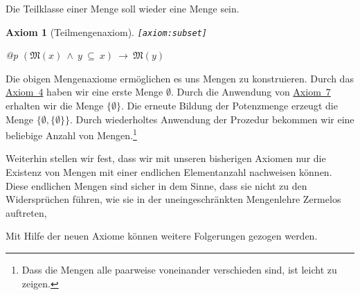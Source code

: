 \documentclass[a4paper,german,10pt,twoside]{book}
\newtheorem{ax}{Axiom}
\theoremstyle{definition}
\theoremstyle{remark}
\begin{document}
\par
Die Teilklasse einer Menge soll wieder eine Menge sein.

\begin{ax}[Teilmengenaxiom]
\label{axiom:subset} \hypertarget{axiom:subset}{}
{\tt \tiny [\verb]axiom:subset]]}
\mbox{}
\begin{longtable}{{@{\extracolsep{\fill}}p{\linewidth}}}
\centering $(\mathfrak{M}(x)\ \land\ y \ \subseteq \ x)\ \rightarrow\ \mathfrak{M}(y)$
\end{longtable}

\end{ax}


Die obigen Mengenaxiome erm{\"o}glichen es uns Mengen zu konstruieren.
Durch das \hyperlink{axiom:emptySet}{Axiom~4} haben wir eine erste Menge $\emptyset$. 
Durch die Anwendung von \hyperlink{axiom:powerSet}{Axiom~7} erhalten wir die Menge
$\{ \emptyset \}$. Die erneute Bildung der Potenzmenge erzeugt die Menge
$\{ \emptyset, \{ \emptyset \} \}$. Durch wiederholtes Anwendung der Prozedur
bekommen wir eine beliebige Anzahl von Mengen.\footnote{Dass die Mengen alle
paarweise voneinander verschieden sind, ist leicht zu zeigen.}

\par
Weiterhin stellen wir fest, dass wir mit unseren bisherigen Axiomen nur die 
Existenz von Mengen mit einer endlichen Elementanzahl nachweisen k{\"o}nnen.
Diese endlichen Mengen sind {\glqq sicher\grqq} in dem Sinne, dass sie nicht zu
den Widerspr{\"u}chen f{\"u}hren, wie sie in der uneingeschr{\"a}nkten Mengenlehre 
Zermelos auftreten,


\par
Mit Hilfe der neuen Axiome k{\"o}nnen weitere Folgerungen gezogen werden.
\end{document}
